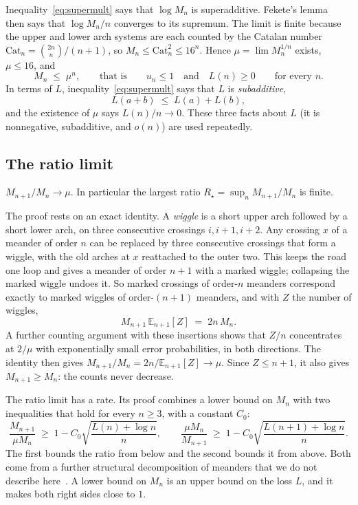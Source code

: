 Inequality~\eqref{eq:supermult} says that $\log M_n$ is superadditive. Fekete's lemma~\cite{Fekete} then says
that $\log M_n/n$ converges to its supremum. The limit is finite because the upper and lower arch
systems are each counted by the Catalan number $\mathrm{Cat}_n=\binom{2n}{n}/(n+1)$, so
$M_n\le\mathrm{Cat}_n^2\le16^n$. Hence $\mu=\lim M_n^{1/n}$
exists, $\mu\le16$, and
\[ M_n\;\le\;\mu^n,\qquad\text{that is}\qquad u_n\le1 \quad\text{and}\quad L(n)\ge0 \qquad\text{for every } n. \]
In terms of $L$, inequality~\eqref{eq:supermult} says that $L$ is \emph{subadditive},
\begin{equation}\label{eq:subadd}
L(a+b)\;\le\;L(a)+L(b),
\end{equation}
and the existence of $\mu$ says $L(n)/n\to0$. These three facts about $L$ (it is nonnegative,
subadditive, and $o(n)$) are used repeatedly.

\subsection{The ratio limit}

\begin{theorem}\label{thm:ratio}
$M_{n+1}/M_n\to\mu$. In particular the largest ratio $R_\star=\sup_n M_{n+1}/M_n$ is finite.
\end{theorem}

The proof rests on an exact identity. A \emph{wiggle} is a short upper arch followed by a short lower
arch, on three consecutive crossings $i,i+1,i+2$. Any crossing $x$ of a meander of order $n$ can be
replaced by three consecutive crossings that form a wiggle, with the old arches at $x$ reattached to
the outer two. This keeps the road one loop and gives a meander of order $n+1$ with a marked wiggle;
collapsing the marked wiggle undoes it. So marked crossings of order-$n$ meanders correspond exactly to
marked wiggles of order-$(n+1)$ meanders, and with $Z$ the number of wiggles,
\[ M_{n+1}\,\mathbb E_{n+1}[Z] \;=\; 2n\,M_n . \]
A further counting argument with these insertions shows that $Z/n$ concentrates at $2/\mu$ with exponentially small error probabilities, in
both directions. The identity then gives
$M_{n+1}/M_n=2n/\mathbb E_{n+1}[Z]\to\mu$. Since $Z\le n+1$, it also gives $M_{n+1}\ge M_n$: the counts never decrease.

The ratio limit has a rate. Its proof combines a lower bound on $M_n$ with two inequalities that
hold for every $n\ge3$, with a constant $C_0$:
\begin{equation}\label{eq:ratioinput}
\frac{M_{n+1}}{\mu M_n}\;\ge\;1-C_0\sqrt{\frac{L(n)+\log n}{n}},\qquad
\frac{\mu M_n}{M_{n+1}}\;\ge\;1-C_0\sqrt{\frac{L(n+1)+\log n}{n}} .
\end{equation}
The first bounds the ratio from below and the second bounds it from above. Both come from a further
structural decomposition of meanders that we do not describe here~\cite{Repo}. A lower bound on
$M_n$ is an upper bound on the loss $L$, and it makes both right sides close to $1$.

